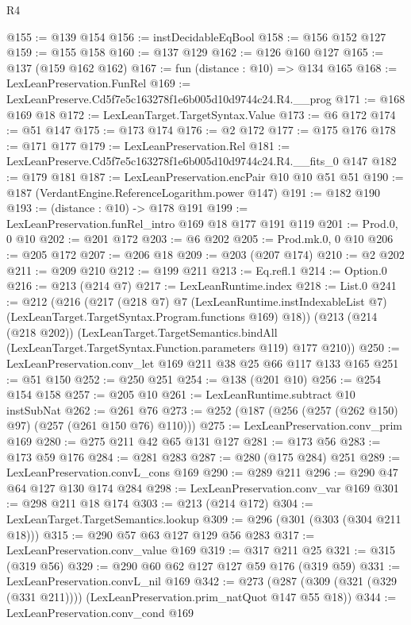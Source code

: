 \begin{lexlean}{R4}
\begin{coremodule}
@155 := @139 @154
@156 := instDecidableEqBool
@158 := @156 @152 @127
@159 := @155 @158
@160 := @137 @129
@162 := @126 @160 @127
@165 := @137 (@159 @162 @162)
@167 := fun (distance : @10) => @134 @165
@168 := LexLeanPreservation.FunRel
@169 := LexLeanPreserve.Cd5f7e5c163278f1e6b005d10d9744c24.R4.__prog
@171 := @168 @169 @18
@172 := LexLeanTarget.TargetSyntax.Value
@173 := @6 @172
@174 := @51 @147
@175 := @173 @174
@176 := @2 @172
@177 := @175 @176
@178 := @171 @177
@179 := LexLeanPreservation.Rel
@181 := LexLeanPreserve.Cd5f7e5c163278f1e6b005d10d9744c24.R4.__fits_0 @147
@182 := @179 @181
@187 := LexLeanPreservation.encPair @10 @10 @51 @51
@190 := @187 (VerdantEngine.ReferenceLogarithm.power @147)
@191 := @182 @190
@193 := (distance : @10) -> @178 @191
@199 := LexLeanPreservation.funRel_intro @169 @18 @177 @191 @119
@201 := Prod.{0, 0} @10
@202 := @201 @172
@203 := @6 @202
@205 := Prod.mk.{0, 0} @10
@206 := @205 @172
@207 := @206 @18
@209 := @203 (@207 @174)
@210 := @2 @202
@211 := @209 @210
@212 := @199 @211
@213 := Eq.refl.{1}
@214 := Option.{0}
@216 := @213 (@214 @7)
@217 := LexLeanRuntime.index
@218 := List.{0}
@241 := @212
    (@216
      (@217
        (@218 @7)
        @7
        (LexLeanRuntime.instIndexableList @7)
        (LexLeanTarget.TargetSyntax.Program.functions @169)
        @18))
    (@213
      (@214 (@218 @202))
      (LexLeanTarget.TargetSemantics.bindAll
        (LexLeanTarget.TargetSyntax.Function.parameters @119)
        @177
        @210))
@250 := LexLeanPreservation.conv_let @169 @211 @38 @25 @66 @117 @133 @165
@251 := @51 @150
@252 := @250 @251
@254 := @138 (@201 @10)
@256 := @254 @154 @158
@257 := @205 @10
@261 := LexLeanRuntime.subtract @10 instSubNat
@262 := @261 @76
@273 := @252 (@187 (@256 (@257 (@262 @150) @97) (@257 (@261 @150 @76) @110)))
@275 := LexLeanPreservation.conv_prim @169
@280 := @275 @211 @42 @65 @131 @127
@281 := @173 @56
@283 := @173 @59 @176
@284 := @281 @283
@287 := @280 (@175 @284) @251
@289 := LexLeanPreservation.convL_cons @169
@290 := @289 @211
@296 := @290 @47 @64 @127 @130 @174 @284
@298 := LexLeanPreservation.conv_var @169
@301 := @298 @211 @18 @174
@303 := @213 (@214 @172)
@304 := LexLeanTarget.TargetSemantics.lookup
@309 := @296 (@301 (@303 (@304 @211 @18)))
@315 := @290 @57 @63 @127 @129 @56 @283
@317 := LexLeanPreservation.conv_value @169
@319 := @317 @211 @25
@321 := @315 (@319 @56)
@329 := @290 @60 @62 @127 @127 @59 @176 (@319 @59)
@331 := LexLeanPreservation.convL_nil @169
@342 := @273 (@287 (@309 (@321 (@329 (@331 @211)))) (LexLeanPreservation.prim_natQuot @147 @55 @18))
@344 := LexLeanPreservation.conv_cond @169

\end{coremodule}
\end{lexlean}

